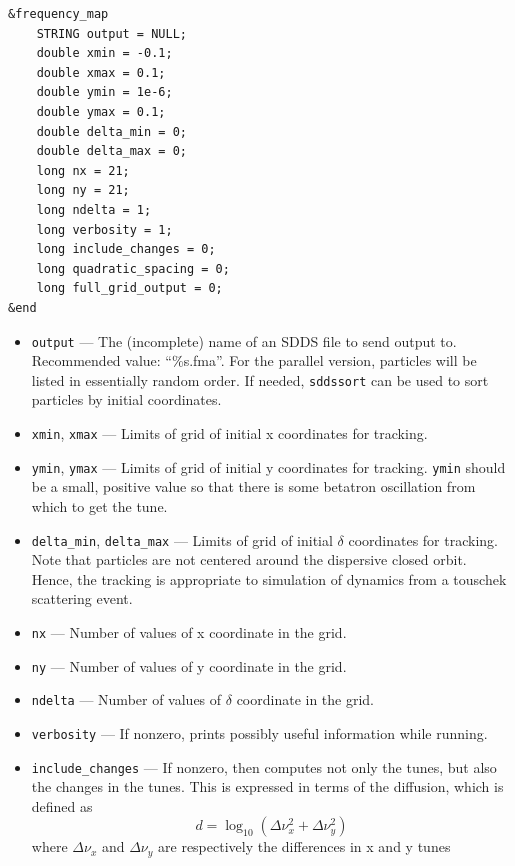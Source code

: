 \documentclass[11pt]{article}
\begin{document}
\begin{verbatim}
&frequency_map
    STRING output = NULL;
    double xmin = -0.1;
    double xmax = 0.1;
    double ymin = 1e-6;
    double ymax = 0.1;
    double delta_min = 0;
    double delta_max = 0;
    long nx = 21;
    long ny = 21;
    long ndelta = 1;
    long verbosity = 1;
    long include_changes = 0;
    long quadratic_spacing = 0;
    long full_grid_output = 0;
&end
\end{verbatim}

\begin{itemize}
\item \verb|output| --- The (incomplete) name of an SDDS file to send output to.  
 Recommended value: ``\%s.fma''.  For the parallel version, particles will be listed in essentially
 random order.  If needed, \verb|sddssort| can be used to sort particles by initial coordinates.
\item \verb|xmin|, \verb|xmax| --- Limits of grid of initial x coordinates for tracking.             
\item \verb|ymin|, \verb|ymax| --- Limits of grid of initial y coordinates for tracking.             
 \verb|ymin| should be a small, positive value so that there                               
 is some betatron oscillation from which to get the tune.                      
\item \verb|delta_min|, \verb|delta_max| --- Limits of grid of initial $\delta$ coordinates
for tracking.  Note that particles are not centered around the dispersive closed orbit.  Hence,
the tracking is appropriate to simulation of dynamics from a touschek scattering event.
\item \verb|nx| --- Number of values of x coordinate in the grid.
\item \verb|ny| --- Number of values of y coordinate in the grid.
\item \verb|ndelta| --- Number of values of $\delta$ coordinate in the grid.
\item \verb|verbosity| --- If nonzero, prints possibly useful information while running.
\item \verb|include_changes| --- If nonzero, then computes not only the tunes, but also
        the changes in the tunes.  This is expressed in terms of the diffusion, which is defined
        as 
\begin{equation}
  d = \log_{10} \left(\Delta\nu_x^2 + \Delta\nu_y^2\right)
\end{equation}
where $\Delta\nu_x$ and $\Delta\nu_y$ are respectively the differences in x and y tunes

\end{itemize}
\end{document}
